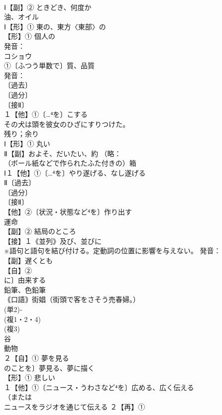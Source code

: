 \documentclass[8pt]{extreport}
\begin{document}
\begin{CJK}{UTF8}{min}
\\	Ⅰ【副】② ときどき、何度か
\\	油、オイル 
\\	Ⅰ【形】① 東の、東方〈東部〉の 
\\	【形】① 個人の 
\\	発音：
\\	コショウ 
\\	①〔ふつう単数で〕質、品質 
\\	発音：
\\	〔過去〕
\\	〔過分〕
\\	〔接Ⅱ〕
\\	１【他】①〔…⁴を〕こする 
\\	その犬は頭を彼女のひざにすりつけた。
\\	残り；余り 
\\	Ⅰ【形】① 丸い 
\\	Ⅱ【副】およそ、だいたい、約 （略：
\\	（ボール紙などで作られたふた付きの）箱
\\	Ⅰ１【他】①〔…⁴を〕やり遂げる、なし遂げる 
\\	Ⅱ〔過去〕
\\	〔過分〕
\\	〔接Ⅱ〕
\\	【他】②〔状況・状態など⁴を〕作り出す
\\	運命 
\\	【副】② 結局のところ
\\	【接】１《並列》及び、並びに 
\\	※語句と語句を結び付ける。定動詞の位置に影響を与えない。 発音：
\\	【副】遅くとも
\\	【自】②
\\	に〕由来する
\\	鉛筆、色鉛筆
\\	｟口語｠街娼（街頭で客をさそう売春婦。）
\\	(単2)‐
\\	(複1・2・4)
\\	(複3)
\\	谷 
\\	動物 
\\	２【自】① 夢を見る　
\\	のことを〕夢見る、夢に描く
\\	【形】① 悲しい 
\\	１【他】①〔ニュース・うわさなど⁴を〕広める、広く伝える 
\\	（または
\\	ニュースをラジオを通じて伝える ２【再】①

\end{CJK}
\end{document}
